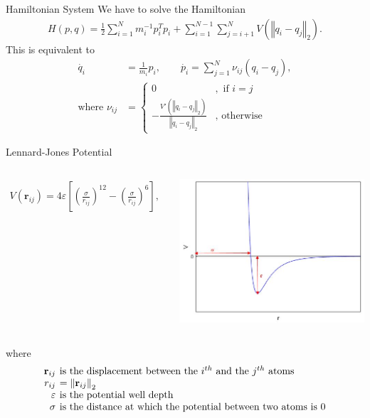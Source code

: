 \documentclass{beamer}
\renewcommand{\vec}[1]{\mathbf{#1}}
\begin{document}
\begin{frame}{Hamiltonian System}
We have to solve the Hamiltonian
\medskip
\begin{align*}
	H(p, q) = \frac{1}{2}\sum_{i = 1}^{N} m_{i}^{-1}p_{i}^{T}p_{i} + \sum_{i=1}^{N-1} \sum_{j=i+1}^{N} V\left(\left\Vert q_{i} - q_{j} \right\Vert_{2}\right).
\end{align*}
This is equivalent to
\begin{align*}
	\dot{q_{i}} &= \frac{1}{m_{i}}p_{i}, \quad \quad \dot{p_{i}} = \sum_{j=1}^{N}\nu_{ij}\left(q_{i} - q_{j}\right), \\
\mbox{where } \nu_{ij} &= 
	\begin{cases}
		0 &, \mbox{ if } i = j \\
		-\frac{V'\left(\left\Vert q_{i} - q_{j} \right\Vert_{2}\right)}{\left\Vert q_{i} - q_{j} \right\Vert_{2}} &, \mbox{ otherwise}
	\end{cases}
\end{align*}
\end{frame}

\begin{frame}{Lennard-Jones Potential}
\begin{columns}
	\begin{align*}
		V\left(\vec{r}_{ij}\right) = 4\varepsilon \left[ \left( \frac{\sigma}{r_{ij}}\right)^{12} - \left( \frac{\sigma}{r_{ij}}\right)^{6} \right],
	\end{align*}

	\centering
	\includegraphics[scale=0.40]{lennard-jones_potential_graph}
\end{columns}
where
$$
\arraycolsep=2pt
\begin{array}{rl}
	\vec{r}_{ij} &\mbox{is the displacement between the $i^{th}$ and the $j^{th}$ atoms} \\
	r_{ij} &= \left\Vert\vec{r}_{ij}\right\Vert_{2} \\
	\varepsilon & \mbox{is the potential well depth} \\
	\sigma & \mbox{is the distance at which the potential between two atoms is 0}
\end{array}
$$
\end{frame}
\end{document}
